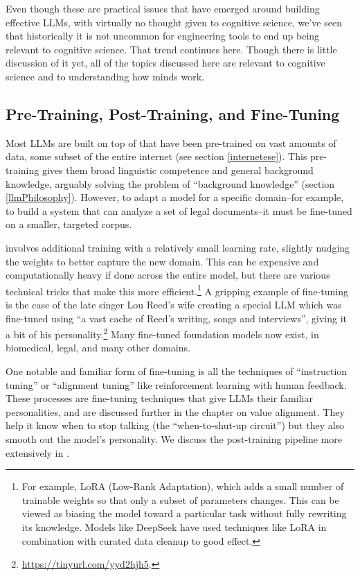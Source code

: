 Even though these are practical issues that have emerged around building
effective LLMs, with virtually no thought given to cognitive science, we've
seen that historically it is not uncommon for engineering tools to end up being
relevant to cognitive science. That trend continues here. Though there is
little discussion of it yet, all of the topics discussed here are relevant to
cognitive science and to understanding how minds work. 

\subsection{Pre-Training, Post-Training, and Fine-Tuning}

Most LLMs are built on top of  that have been
pre-trained on vast amounts of data, some subset of the entire internet (see
section \ref{internetese}). This pre-training gives them broad linguistic
competence and general background knowledge, arguably solving the problem of
``background knowledge'' (section \ref{llmPhilosophy}). However, to adapt a
model for a specific domain--for example, to build a system that can analyze a
set of legal documents--it must be fine-tuned on a smaller, targeted corpus.

 involves additional training with a relatively small
learning rate, slightly nudging the weights to better capture the new domain.
This can be expensive and computationally heavy if done across the entire
model, but there are various technical tricks that make this more
efficient.\footnote{For example, LoRA (Low-Rank Adaptation), which adds a small
number of trainable weights so that only a subset of parameters changes. This
can be viewed as biasing the model toward a particular task without fully
rewriting its knowledge. Models like DeepSeek have used techniques like LoRA in
combination with curated data cleanup to good effect.} A gripping example of
fine-tuning is the case of the late singer Lou Reed's wife creating a special
LLM which was fine-tuned using ``a vast cache of Reed's writing, songs and
interviews'', giving it a bit of his
personality.\footnote{\url{https://tinyurl.com/yyd2hjh5}.}  Many fine-tuned
foundation models now exist, in biomedical, legal, and many other domains.

One notable and familiar form of fine-tuning is all the techniques of
``instruction tuning'' or ``alignment tuning'' like reinforcement learning with
human feedback.  These processes are fine-tuning techniques that give LLMs
their familiar personalities, and are discussed further in the chapter on value
alignment. They help it know when to stop talking (the ``when-to-shut-up
circuit'') but they also smooth out the model's personality. We discuss the
post-training pipeline more extensively in .

